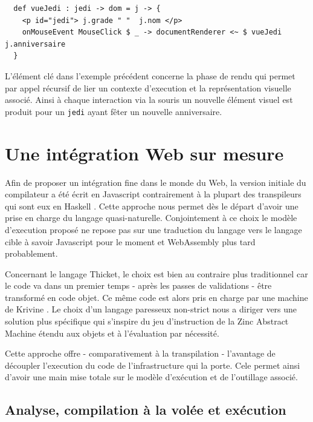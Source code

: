 \documentclass[twoside,a4paper]{article}
\begin{document}
\begin{lstlisting}
  def vueJedi : jedi -> dom = j -> {
    <p id="jedi"> j.grade " "  j.nom </p> 
    onMouseEvent MouseClick $ _ -> documentRenderer <~ $ vueJedi j.anniversaire
  }
\end{lstlisting}

L'élément clé dans l'exemple précédent  concerne la phase de rendu qui
permet  par appel  récursif  de  lier un  contexte  d'execution et  la
représentation visuelle  associé.  Ainsi  à chaque interaction  via la
souris un nouvelle élément visuel est produit pour un {\tt jedi} ayant
fêter un nouvelle anniversaire.

\section{Une intégration Web sur mesure}

Afin de proposer un intégration fine  dans le monde du Web, la version
initiale du compilateur  a été écrit en Javascript  contrairement à la
plupart  des   transpileurs  qui   sont  eux  en   Haskell  \cite{elm}
\cite{purescript}. Cette  approche nous  permet dès le  départ d'avoir
une prise  en charge  du langage  quasi-naturelle. Conjointement  à ce
choix le modèle  d'execution proposé ne repose pas  sur une traduction
du langage vers le langage cible à savoir Javascript pour le moment et
WebAssembly \cite{rossberg2016webassembly} plus  tard probablement. 

Concernant le  langage Thicket,  le choix est  bien au  contraire plus
traditionnel car le  code va dans un premier temps  - après les passes
de validations - être transformé en code objet. Ce même code est alors
pris en  charge par  une machine  de Krivine  \cite{krivine:2007}.  Le
choix  d'un  langage paresseux  non-strict  nous  a diriger  vers  une
solution plus spécifique qui s'inspire  du jeu d'instruction de la Zinc
Abstract Machine \cite{zinc}  étendu aux objets et  à l'évaluation par
nécessité.

Cette approche offre - comparativement à la transpilation - l'avantage
de  découpler   l'execution  du   code  de  l'infrastructure   qui  la
porte. Cele  permet ainsi d'avoir une  main mise totale sur  le modèle
d'exécution et de l'outillage associé.

\subsection{Analyse, compilation à la volée et exécution}
\end{document}
